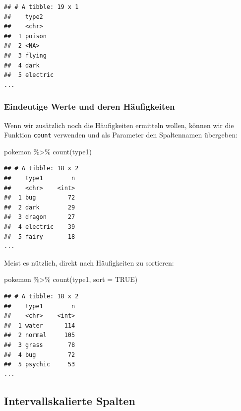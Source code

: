 \documentclass[
]{book}
\newenvironment{Shaded}{\begin{snugshade}}{\end{snugshade}}
\newcommand{\AttributeTok}[1]{\textcolor[rgb]{0.77,0.63,0.00}{#1}}
\newcommand{\ConstantTok}[1]{\textcolor[rgb]{0.00,0.00,0.00}{#1}}
\newcommand{\FunctionTok}[1]{\textcolor[rgb]{0.00,0.00,0.00}{#1}}
\newcommand{\NormalTok}[1]{#1}
\newcommand{\SpecialCharTok}[1]{\textcolor[rgb]{0.00,0.00,0.00}{#1}}
\begin{document}
\begin{verbatim}
## # A tibble: 19 x 1
##    type2   
##    <chr>   
##  1 poison  
##  2 <NA>    
##  3 flying  
##  4 dark    
##  5 electric
...
\end{verbatim}

\hypertarget{eindeutige-werte-und-deren-huxe4ufigkeiten}{%
\subsubsection{Eindeutige Werte und deren Häufigkeiten}\label{eindeutige-werte-und-deren-huxe4ufigkeiten}}

Wenn wir zusätzlich noch die Häufigkeiten ermitteln wollen, können wir die Funktion \texttt{count} verwenden und als Parameter den Spaltennamen übergeben:

\begin{Shaded}
\begin{Highlighting}[]
\NormalTok{pokemon }\SpecialCharTok{\%\textgreater{}\%} 
  \FunctionTok{count}\NormalTok{(type1)}
\end{Highlighting}
\end{Shaded}

\begin{verbatim}
## # A tibble: 18 x 2
##    type1        n
##    <chr>    <int>
##  1 bug         72
##  2 dark        29
##  3 dragon      27
##  4 electric    39
##  5 fairy       18
...
\end{verbatim}

Meist es nützlich, direkt nach Häufigkeiten zu sortieren:

\begin{Shaded}
\begin{Highlighting}[]
\NormalTok{pokemon }\SpecialCharTok{\%\textgreater{}\%} 
  \FunctionTok{count}\NormalTok{(type1, }\AttributeTok{sort =} \ConstantTok{TRUE}\NormalTok{)}
\end{Highlighting}
\end{Shaded}

\begin{verbatim}
## # A tibble: 18 x 2
##    type1        n
##    <chr>    <int>
##  1 water      114
##  2 normal     105
##  3 grass       78
##  4 bug         72
##  5 psychic     53
...
\end{verbatim}

\hypertarget{wertebereich-intervallskaliert}{%
\subsection{Intervallskalierte Spalten}\label{wertebereich-intervallskaliert}}
\end{document}
